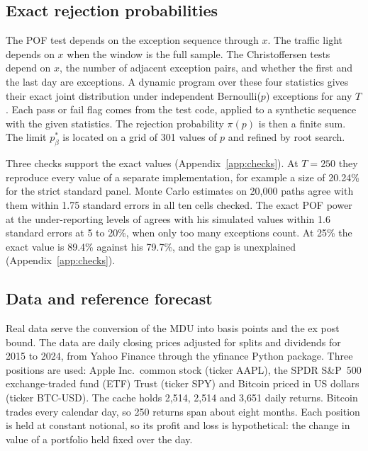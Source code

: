 \documentclass[11pt]{article}
\begin{document}
\subsection{Exact rejection probabilities}
\label{sec:exact}

The POF test depends on the exception sequence through $x$. The traffic light
depends on $x$ when the window is the full sample. The Christoffersen tests
depend on $x$, the number of adjacent exception pairs, and whether the first
and the last day are exceptions. A dynamic program over these four statistics
gives their exact joint distribution under independent Bernoulli($p$)
exceptions for any $T$. Each pass or fail flag comes from the test code, applied to a synthetic
sequence with the given statistics. The rejection probability $\pi(p)$ is then
a finite sum. The limit $p^*_\beta$ is located on a grid of 301 values of $p$
and refined by root search.

Three checks support the exact values (Appendix~\ref{app:checks}). At $T = 250$
they reproduce every value of a separate implementation, for example a size of
20.24\% for the strict standard panel. Monte Carlo estimates on 20,000 paths
agree with them within 1.75 standard errors in all ten cells checked. The
exact POF power at the under-reporting levels of \citet{campbell2005} agrees
with his simulated values within 1.6 standard errors at 5 to 20\%, when only
too many exceptions count. At 25\% the exact value is 89.4\% against his
79.7\%, and the gap is unexplained (Appendix~\ref{app:checks}).

\subsection{Data and reference forecast}
\label{sec:data}

Real data serve the conversion of the MDU into basis points and the ex post
bound. The data are daily closing prices adjusted for splits and
dividends for 2015 to 2024, from Yahoo Finance through the yfinance Python
package. Three positions are used: Apple Inc.\ common stock
(ticker AAPL), the SPDR S\&P~500 exchange-traded fund (ETF) Trust (ticker SPY)
and Bitcoin priced in US dollars (ticker BTC-USD). The cache holds 2,514, 2,514 and 3,651 daily returns. Bitcoin trades every calendar day, so 250 returns span about eight months. Each position is held at constant notional, so its profit and loss is
hypothetical: the change in value of a portfolio held fixed over the day.
\end{document}
